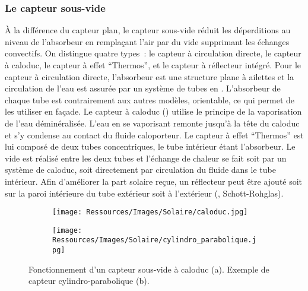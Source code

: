 \subsubsection{Le capteur sous-vide} %
\label{ssub:le_capteur_sous_vide}
À la différence du capteur plan, le capteur sous-vide réduit les déperditions au niveau de
l’absorbeur en remplaçant l’air par du vide supprimant les échanges convectifs. On
distingue quatre types~: le capteur à circulation directe, le capteur à caloduc, le
capteur à effet \enquote{Thermos}, et le capteur à réflecteur intégré. Pour le capteur à
circulation directe, l’absorbeur est une structure plane à ailettes et la circulation de
l’eau est assurée par un système de tubes en . L’absorbeur de chaque tube est
contrairement aux autres modèles, orientable, ce qui permet de les utiliser en façade. Le
capteur à caloduc () utilise le principe de la vaporisation
de l’eau déminéralisée. L’eau en se
vaporisant remonte jusqu’à la tête du caloduc et s’y condense au contact du fluide
caloporteur. Le capteur à effet \enquote{Thermos} est lui composé de deux tubes concentriques,
le tube intérieur étant l’absorbeur. Le vide est réalisé entre les deux tubes et l’échange
de chaleur se fait soit par un système de caloduc, soit directement par circulation du
fluide dans le tube intérieur. Afin d’améliorer la part solaire reçue, un réflecteur peut
être ajouté soit sur la paroi intérieure du tube extérieur soit à l’extérieur
(, Schott-Rohglas).

\begin{figure}
    \centering
    \begin{subfigure}[b]{0.35\textwidth}
        \centering
        \texttt{[image: Ressources/Images/Solaire/caloduc.jpg]}
        \caption{}
        \label{fig:capteur_sous_vide}
    \end{subfigure}
    \quad
    \begin{subfigure}[b]{0.55\textwidth}
        \centering
        \texttt{[image: Ressources/Images/Solaire/cylindro\_parabolique.jpg]}
        \caption{}
        \label{fig:capteur_cylindro_parabolique}
    \end{subfigure}
    \caption[Description d’un capteur sous-vide et exemple d’un capteur cylindro-paraboliques]
             {Fonctionnement d’un capteur sous-vide à caloduc (a). Exemple de
              capteur cylindro-parabolique (b).}
    \label{fig:capteur_vide_parabolique}
\end{figure}


